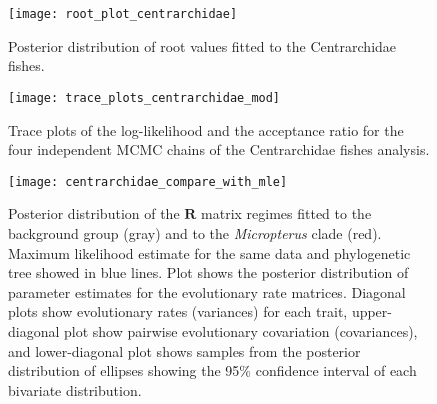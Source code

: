 \begin{figure}[h]
	\centering
	\texttt{[image: root\_plot\_centrarchidae]}
	\caption[Posterior distribution of root values fitted to the Centrarchidae fishes.]{Posterior distribution of root values fitted to the Centrarchidae fishes.}
	\label{fig:sup_root_centrarchidae}
\end{figure}

\begin{figure}[h]
	\centering
	\texttt{[image: trace\_plots\_centrarchidae\_mod]}
	\caption[Trace plots of the log-likelihood and the acceptance ratio for the four independent MCMC chains of the Centrarchidae fishes analysis.]{Trace plots of the log-likelihood and the acceptance ratio for the four independent MCMC chains of the Centrarchidae fishes analysis. }
	\label{fig:sup_trace_centrarchidae}
\end{figure}

\begin{figure}[h]
	\centering
	\texttt{[image: centrarchidae\_compare\_with\_mle]}
	\caption[Posterior distribution of the $\mathbf{R}$ matrix regimes fitted to the background group and to the \textit{Micropterus} clade.]{Posterior distribution of the $\mathbf{R}$ matrix regimes fitted to the background group (gray) and to the \textit{Micropterus} clade (red). Maximum likelihood estimate for the same data and phylogenetic tree showed in blue lines. Plot shows the posterior distribution of parameter estimates for the evolutionary rate matrices. Diagonal plots show evolutionary rates (variances) for each trait, upper-diagonal plot show pairwise evolutionary covariation (covariances), and lower-diagonal plot shows samples from the posterior distribution of ellipses showing the 95\% confidence interval of each bivariate distribution.}
	\label{fig:centrarchidae_mle}
\end{figure}